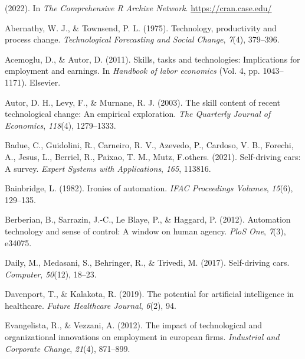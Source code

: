 \documentclass[
  man]{apa7}
\newlength{\cslhangindent}
\newlength{\cslentryspacingunit} %
\newenvironment{CSLReferences}[2] %
 {%
  \setlength{\parindent}{0pt}
  \ifodd #1
  \let\oldpar\par
  \def\par{\hangindent=\cslhangindent\oldpar}
  \fi
  \setlength{\parskip}{#2\cslentryspacingunit}
 }%
 {}
\begin{document}
\hypertarget{refs}{}
\begin{CSLReferences}{1}{0}
\leavevmode{}%
(2022). In \emph{The Comprehensive R Archive Network}. \url{https://cran.case.edu/}

\leavevmode{}%
Abernathy, W. J., \& Townsend, P. L. (1975). Technology, productivity and process change. \emph{Technological Forecasting and Social Change}, \emph{7}(4), 379--396.

\leavevmode{}%
Acemoglu, D., \& Autor, D. (2011). Skills, tasks and technologies: Implications for employment and earnings. In \emph{Handbook of labor economics} (Vol. 4, pp. 1043--1171). Elsevier.

\leavevmode{}%
Autor, D. H., Levy, F., \& Murnane, R. J. (2003). The skill content of recent technological change: An empirical exploration. \emph{The Quarterly Journal of Economics}, \emph{118}(4), 1279--1333.

\leavevmode{}%
Badue, C., Guidolini, R., Carneiro, R. V., Azevedo, P., Cardoso, V. B., Forechi, A., Jesus, L., Berriel, R., Paixao, T. M., Mutz, F.others. (2021). Self-driving cars: A survey. \emph{Expert Systems with Applications}, \emph{165}, 113816.

\leavevmode{}%
Bainbridge, L. (1982). Ironies of automation. \emph{IFAC Proceedings Volumes}, \emph{15}(6), 129--135.

\leavevmode{}%
Berberian, B., Sarrazin, J.-C., Le Blaye, P., \& Haggard, P. (2012). Automation technology and sense of control: A window on human agency. \emph{PloS One}, \emph{7}(3), e34075.

\leavevmode{}%
Daily, M., Medasani, S., Behringer, R., \& Trivedi, M. (2017). Self-driving cars. \emph{Computer}, \emph{50}(12), 18--23.

\leavevmode{}%
Davenport, T., \& Kalakota, R. (2019). The potential for artificial intelligence in healthcare. \emph{Future Healthcare Journal}, \emph{6}(2), 94.

\leavevmode{}%
Evangelista, R., \& Vezzani, A. (2012). The impact of technological and organizational innovations on employment in european firms. \emph{Industrial and Corporate Change}, \emph{21}(4), 871--899.


\end{CSLReferences}
\end{document}
